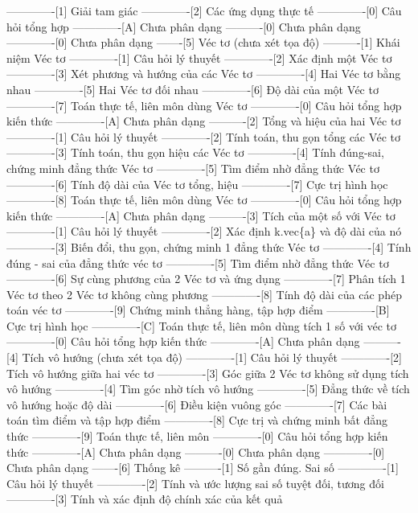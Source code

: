 -------------[1] Giải tam giác
-------------[2] Các ứng dụng thực tế
-------------[0] Câu hỏi tổng hợp
-------------[A] Chưa phân dạng
----------[0] Chưa phân dạng
-------------[0] Chưa phân dạng
-------[5] Véc tơ (chưa xét tọa độ)
----------[1] Khái niệm Véc tơ
-------------[1] Câu hỏi lý thuyết
-------------[2] Xác định một Véc tơ
-------------[3] Xét phương và hướng của các Véc tơ
-------------[4] Hai Véc tơ bằng nhau
-------------[5] Hai Véc tơ đối nhau
-------------[6] Độ dài của một Véc tơ
-------------[7] Toán thực tế, liên môn dùng Véc tơ
-------------[0] Câu hỏi tổng hợp kiến thức
-------------[A] Chưa phân dạng
----------[2] Tổng và hiệu của hai Véc tơ
-------------[1] Câu hỏi lý thuyết
-------------[2] Tính toán, thu gọn tổng các Véc tơ
-------------[3] Tính toán, thu gọn hiệu các Véc tơ
-------------[4] Tính đúng-sai, chứng minh đẳng thức Véc tơ
-------------[5] Tìm điểm nhờ đẳng thức Véc tơ
-------------[6] Tính độ dài của Véc tơ tổng, hiệu
-------------[7] Cực trị hình học
-------------[8] Toán thực tế, liên môn dùng Véc tơ
-------------[0] Câu hỏi tổng hợp kiến thức
-------------[A] Chưa phân dạng
----------[3] Tích của một số với Véc tơ
-------------[1] Câu hỏi lý thuyết
-------------[2] Xác định k.vec\{a\} và độ dài của nó
-------------[3] Biến đổi, thu gọn, chứng minh 1 đẳng thức Véc tơ
-------------[4] Tính đúng - sai của đẳng thức véc tơ
-------------[5] Tìm điểm nhờ đẳng thức Véc tơ
-------------[6] Sự cùng phương của 2 Véc tơ và ứng dụng
-------------[7] Phân tích 1 Véc tơ theo 2 Véc tơ không cùng phương
-------------[8] Tính độ dài của các phép toán véc tơ
-------------[9] Chứng minh thẳng hàng, tập hợp điểm
-------------[B] Cực trị hình học
-------------[C] Toán thực tế, liên môn dùng tích 1 số với véc tơ
-------------[0] Câu hỏi tổng hợp kiến thức
-------------[A] Chưa phân dạng
----------[4] Tích vô hướng (chưa xét tọa độ)
-------------[1] Câu hỏi lý thuyết
-------------[2] Tích vô hướng giữa hai véc tơ
-------------[3] Góc giữa 2 Véc tơ không sử dụng tích vô hướng
-------------[4] Tìm góc nhờ tích vô hướng
-------------[5] Đẳng thức về tích vô hướng hoặc độ dài
-------------[6] Điều kiện vuông góc
-------------[7] Các bài toán tìm điểm và tập hợp điểm
-------------[8] Cực trị và chứng minh bất đẳng thức
-------------[9] Toán thực tế, liên môn
-------------[0] Câu hỏi tổng hợp kiến thức
-------------[A] Chưa phân dạng
----------[0] Chưa phân dạng
-------------[0] Chưa phân dạng
-------[6] Thống kê
----------[1] Số gần đúng. Sai số
-------------[1] Câu hỏi lý thuyết
-------------[2] Tính và ước lượng sai số tuyệt đối, tương đối
-------------[3] Tính và xác định độ chính xác của kết quả
